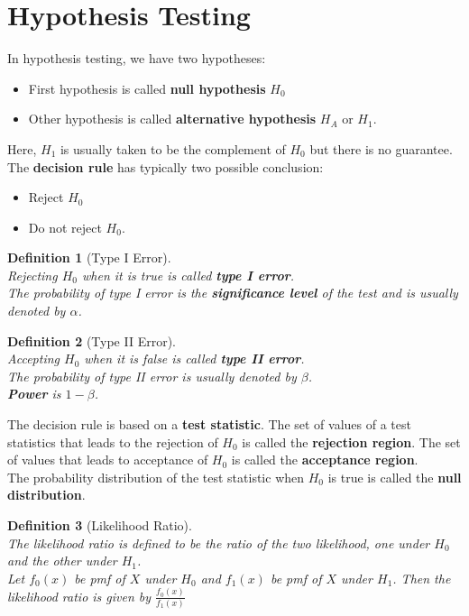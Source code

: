 \documentclass[12pt]{article}
\newtheorem{definition}{Definition}[section]
\theoremstyle{definition}
\begin{document}
\section{Hypothesis Testing}  
In hypothesis testing, we have two hypotheses:
\begin{itemize}
  \item First hypothesis is called \textbf{null hypothesis} $H_0$
  \item Other hypothesis is called \textbf{alternative hypothesis} $H_A$ or $H_1$.
\end{itemize}
Here, $H_1$ is usually taken to be the complement of $H_0$ but there is no guarantee.\\
The \textbf{decision rule} has typically two possible conclusion:
\begin{itemize}
  \item Reject $H_0$
  \item Do not reject $H_0$.
\end{itemize}
\begin{definition}[Type I Error]
\hfill\\\normalfont Rejecting $H_0$ when it is true is called \textbf{type I error}.\\
The probability of type I error is the \textbf{significance level} of the test and is usually denoted by $\alpha$.
\end{definition}
\begin{definition}[Type II Error]
\hfill\\\normalfont Accepting $H_0$ when it is false is called \textbf{type II error}.\\
The probability of type II error is usually denoted by $\beta$. \\\textbf{Power} is $1-\beta$.
\end{definition}
The decision rule is based on a \textbf{test statistic}. The set of values of a test statistics that leads to the rejection of $H_0$ is called the \textbf{rejection region}. The set of values that leads to acceptance of $H_0$ is called the \textbf{acceptance region}.\\
The probability distribution of the test statistic when $H_0$ is true is called the \textbf{null distribution}.
\begin{definition}[Likelihood Ratio]
\hfill\\\normalfont The likelihood ratio is defined to be the ratio of the two likelihood, one under $H_0$ and the other under $H_1$.\\
Let $f_0(x)$ be pmf of $X$ under $H_0$ and $f_1(x)$ be pmf of $X$ under $H_1$. Then the likelihood ratio is given by
$
\frac{f_0(x)}{f_1(x)}
$
\end{definition}
\end{document}

